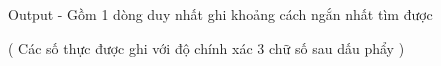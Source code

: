 Output
- Gồm 1 dòng duy nhất ghi khoảng cách ngắn nhất tìm được  

   ( Các số thực được ghi với độ chính xác 3 chữ số sau dấu phẩy )